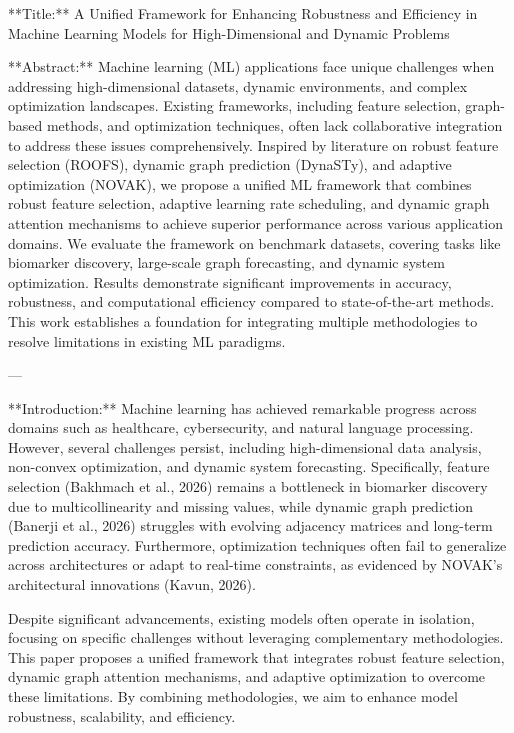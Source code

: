 **Title:**  
A Unified Framework for Enhancing Robustness and Efficiency in Machine Learning Models for High-Dimensional and Dynamic Problems  

**Abstract:**  
Machine learning (ML) applications face unique challenges when addressing high-dimensional datasets, dynamic environments, and complex optimization landscapes. Existing frameworks, including feature selection, graph-based methods, and optimization techniques, often lack collaborative integration to address these issues comprehensively. Inspired by literature on robust feature selection (ROOFS), dynamic graph prediction (DynaSTy), and adaptive optimization (NOVAK), we propose a unified ML framework that combines robust feature selection, adaptive learning rate scheduling, and dynamic graph attention mechanisms to achieve superior performance across various application domains. We evaluate the framework on benchmark datasets, covering tasks like biomarker discovery, large-scale graph forecasting, and dynamic system optimization. Results demonstrate significant improvements in accuracy, robustness, and computational efficiency compared to state-of-the-art methods. This work establishes a foundation for integrating multiple methodologies to resolve limitations in existing ML paradigms.

---

**Introduction:**  
Machine learning has achieved remarkable progress across domains such as healthcare, cybersecurity, and natural language processing. However, several challenges persist, including high-dimensional data analysis, non-convex optimization, and dynamic system forecasting. Specifically, feature selection (Bakhmach et al., 2026) remains a bottleneck in biomarker discovery due to multicollinearity and missing values, while dynamic graph prediction (Banerji et al., 2026) struggles with evolving adjacency matrices and long-term prediction accuracy. Furthermore, optimization techniques often fail to generalize across architectures or adapt to real-time constraints, as evidenced by NOVAK's architectural innovations (Kavun, 2026).

Despite significant advancements, existing models often operate in isolation, focusing on specific challenges without leveraging complementary methodologies. This paper proposes a unified framework that integrates robust feature selection, dynamic graph attention mechanisms, and adaptive optimization to overcome these limitations. By combining methodologies, we aim to enhance model robustness, scalability, and efficiency.

